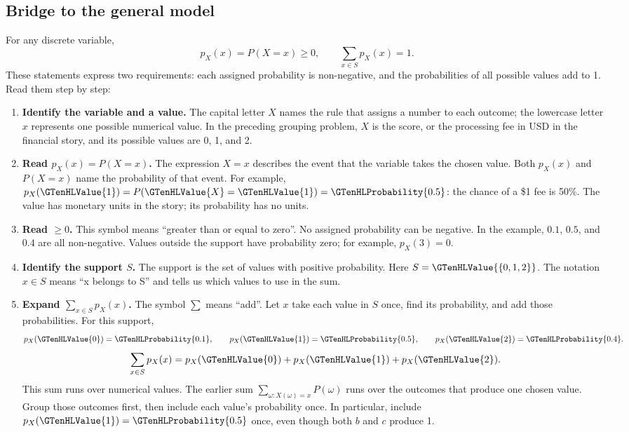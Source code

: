 \subsection{Bridge to the general model}
For any discrete variable,
\[p_X(x)=P(X=x)\geq0,\qquad \sum_{x\in S}p_X(x)=1.\]
These statements express two requirements: each assigned probability is non-negative, and the probabilities of all possible values add to 1. Read them step by step:
\begin{enumerate}
\item \textbf{Identify the variable and a value.} The capital letter $X$ names the rule that assigns a number to each outcome; the lowercase letter $x$ represents one possible numerical value. In the preceding grouping problem, $X$ is the score, or the processing fee in USD in the financial story, and its possible values are 0, 1, and 2.
\item \textbf{Read $p_X(x)=P(X=x)$.} The expression $X=x$ describes the event that the variable takes the chosen value. Both $p_X(x)$ and $P(X=x)$ name the probability of that event. For example, $p_X(\GTenHLValue{1})=P(\GTenHLValue{X}=\GTenHLValue{1})=\GTenHLProbability{0.5}$: the chance of a \$1 fee is 50\%. The value has monetary units in the story; its probability has no units.
\item \textbf{Read $\geq0$.} This symbol means ``greater than or equal to zero''. No assigned probability can be negative. In the example, $0.1$, $0.5$, and $0.4$ are all non-negative. Values outside the support have probability zero; for example, $p_X(3)=0$.
\item \textbf{Identify the support $S$.} The support is the set of values with positive probability. Here $S=\GTenHLValue{\{0,1,2\}}$. The notation $x\in S$ means ``x belongs to S'' and tells us which values to use in the sum.
\item \textbf{Expand $\sum_{x\in S}p_X(x)$.} The symbol $\sum$ means ``add''. Let $x$ take each value in $S$ once, find its probability, and add those probabilities. For this support,
\[
p_X(\GTenHLValue{0})=\GTenHLProbability{0.1},\qquad
p_X(\GTenHLValue{1})=\GTenHLProbability{0.5},\qquad
p_X(\GTenHLValue{2})=\GTenHLProbability{0.4}.
\]
\[
\sum_{x\in S}p_X(x)=p_X(\GTenHLValue{0})+p_X(\GTenHLValue{1})+p_X(\GTenHLValue{2}).
\]
This sum runs over numerical values. The earlier sum $\sum_{\omega:X(\omega)=x}P(\omega)$ runs over the outcomes that produce one chosen value. Group those outcomes first, then include each value's probability once. In particular, include $p_X(\GTenHLValue{1})=\GTenHLProbability{0.5}$ once, even though both $b$ and $c$ produce 1.

\end{enumerate}
